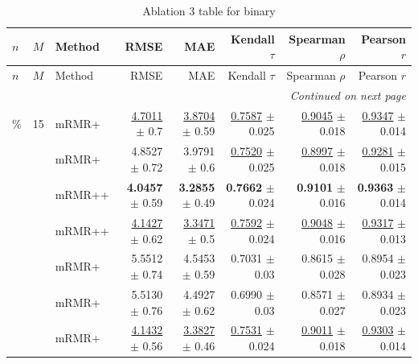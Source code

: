 \footnotesize
\setlength{\tabcolsep}{2pt}
\renewcommand{\arraystretch}{1.05}
\setlength{\LTpre}{0pt}
\setlength{\LTpost}{0pt}
\setlength{\LTleft}{\fill}
\setlength{\LTright}{\fill}
\begin{longtable}{llp{}rrrrr}
\caption{Ablation 3 table for binary}\label{tab:ablation\_3\_binary}\\
\toprule
$n$ & $M$ & Method & RMSE & MAE & Kendall $\tau$ & Spearman $\rho$ & Pearson $r$ \\
\midrule
\endfirsthead
\toprule
$n$ & $M$ & Method & RMSE & MAE & Kendall $\tau$ & Spearman $\rho$ & Pearson $r$ \\
\midrule
\endhead
\midrule
\multicolumn{8}{r}{\emph{Continued on next page}} \\
\midrule
\endfoot
\bottomrule
\endlastfoot
5\% & 15 & mRMR+ & \underline{4.7011} {\scriptsize $\pm$ 0.7} & \underline{3.8704} {\scriptsize $\pm$ 0.59} & \underline{0.7587} {\scriptsize $\pm$ 0.025} & \underline{0.9045} {\scriptsize $\pm$ 0.018} & \underline{0.9347} {\scriptsize $\pm$ 0.014} \\
 &  & mRMR+ & 4.8527 {\scriptsize $\pm$ 0.72} & 3.9791 {\scriptsize $\pm$ 0.6} & \underline{0.7520} {\scriptsize $\pm$ 0.025} & \underline{0.8997} {\scriptsize $\pm$ 0.018} & \underline{0.9281} {\scriptsize $\pm$ 0.015} \\
 &  & mRMR++ & \textbf{4.0457} {\scriptsize $\pm$ 0.59} & \textbf{3.2855} {\scriptsize $\pm$ 0.49} & \textbf{0.7662} {\scriptsize $\pm$ 0.024} & \textbf{0.9101} {\scriptsize $\pm$ 0.016} & \textbf{0.9363} {\scriptsize $\pm$ 0.014} \\
 &  & mRMR++ & \underline{4.1427} {\scriptsize $\pm$ 0.62} & \underline{3.3471} {\scriptsize $\pm$ 0.5} & \underline{0.7592} {\scriptsize $\pm$ 0.024} & \underline{0.9048} {\scriptsize $\pm$ 0.016} & \underline{0.9317} {\scriptsize $\pm$ 0.013} \\
 &  & mRMR+ & 5.5512 {\scriptsize $\pm$ 0.74} & 4.5453 {\scriptsize $\pm$ 0.59} & 0.7031 {\scriptsize $\pm$ 0.03} & 0.8615 {\scriptsize $\pm$ 0.028} & 0.8954 {\scriptsize $\pm$ 0.023} \\
 &  & mRMR+ & 5.5130 {\scriptsize $\pm$ 0.76} & 4.4927 {\scriptsize $\pm$ 0.62} & 0.6990 {\scriptsize $\pm$ 0.03} & 0.8571 {\scriptsize $\pm$ 0.027} & 0.8934 {\scriptsize $\pm$ 0.023} \\
 &  & mRMR+ & \underline{4.1432} {\scriptsize $\pm$ 0.56} & \underline{3.3827} {\scriptsize $\pm$ 0.46} & \underline{0.7531} {\scriptsize $\pm$ 0.024} & \underline{0.9011} {\scriptsize $\pm$ 0.018} & \underline{0.9303} {\scriptsize $\pm$ 0.014} \\

\end{longtable}
